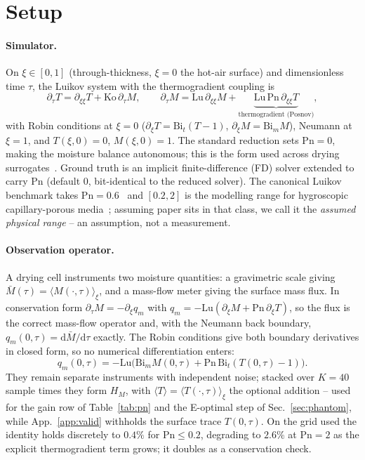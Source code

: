 \documentclass{article}
\begin{document}
\section{Setup}\label{sec:setup}
\paragraph{Simulator.} On $\xi\in[0,1]$ (through-thickness, $\xi{=}0$ the hot-air surface) and
dimensionless time $\tau$, the Luikov system with the thermogradient coupling
is~\cite{lugon2003,luikov1975}
\begin{equation}\label{eq:luikov}
\partial_\tau T=\partial_{\xi\xi}T+\mathrm{Ko}\,\partial_\tau M,\qquad
\partial_\tau M=\mathrm{Lu}\,\partial_{\xi\xi}M+\underbrace{\mathrm{Lu}\,\mathrm{Pn}\,\partial_{\xi\xi}T}_{\text{thermogradient (Posnov)}},
\end{equation}
with Robin conditions at $\xi{=}0$ ($\partial_\xi T{=}\mathrm{Bi}_t(T{-}1)$, $\partial_\xi M{=}\mathrm{Bi}_m M$),
Neumann at $\xi{=}1$, and $T(\xi,0){=}0$, $M(\xi,0){=}1$. The standard reduction sets $\mathrm{Pn}{=}0$,
making the moisture balance autonomous; this is the form used across drying
surrogates~\cite{manavi2024,laubscher2021}. Ground truth is an implicit finite-difference (FD) solver
extended to carry $\mathrm{Pn}$ (default $0$, bit-identical to the reduced solver). The canonical
Luikov benchmark takes $\mathrm{Pn}{=}0.6$~\cite{lugon2003} and $[0.2,2]$ is the modelling range for
hygroscopic capillary-porous media~\cite{luikov1975}; assuming paper sits in that class, we call it
the \emph{assumed physical range} -- an assumption, not a measurement.

\paragraph{Observation operator.} A drying cell instruments two moisture quantities: a gravimetric
scale giving $\bar M(\tau)=\langle M(\cdot,\tau)\rangle_\xi$, and a mass-flow meter giving the surface
mass flux. In conservation form $\partial_\tau M=-\partial_\xi q_m$ with
$q_m=-\mathrm{Lu}(\partial_\xi M+\mathrm{Pn}\,\partial_\xi T)$, so the flux is the correct mass-flow
operator and, with the Neumann back boundary, $q_m(0,\tau)=\mathrm{d}\bar M/\mathrm{d}\tau$ exactly.
The Robin conditions give both boundary derivatives in closed form, so no numerical differentiation
enters:
\begin{equation}\label{eq:flux}
q_m(0,\tau)=-\mathrm{Lu}\bigl(\mathrm{Bi}_m M(0,\tau)+\mathrm{Pn}\,\mathrm{Bi}_t(T(0,\tau)-1)\bigr).
\end{equation}
They remain separate instruments with independent noise; stacked over $K{=}40$ sample times they form
$H_M$, with $\langle T\rangle{=}\langle T(\cdot,\tau)\rangle_\xi$ the optional addition -- used for the
gain row of Table~\ref{tab:pn} and the E-optimal step of Sec.~\ref{sec:phantom}, while
App.~\ref{app:valid} withholds the surface trace $T(0,\tau)$. On the grid used the identity holds
discretely to $0.4\%$ for $\mathrm{Pn}\!\le\!0.2$, degrading to $2.6\%$ at $\mathrm{Pn}{=}2$ as the
explicit thermogradient term grows; it doubles as a conservation check.
\end{document}
